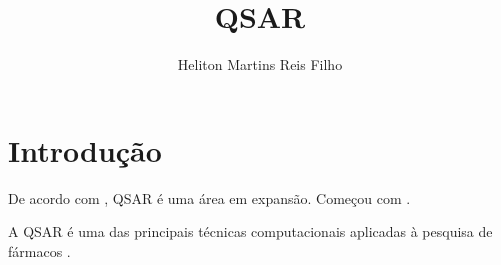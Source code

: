 \documentclass[12pt]{book}
\title{QSAR}
\author{Heliton Martins Reis Filho}
\begin{document}
\maketitle

\chapter{Introdução}

De acordo com \textcite{Cherkasov2014}, QSAR é uma área em expansão. Começou com \textcite{Cramer1988}.

A QSAR é uma das principais técnicas computacionais aplicadas à pesquisa de fármacos \cite{Cherkasov2014}.

\textcite{Shi2015}

\textcite{Roy2015}

\printbibliography
\end{document}
